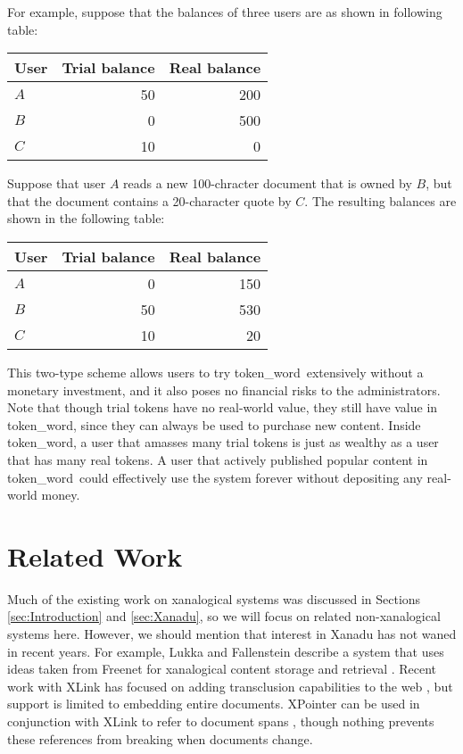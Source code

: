 \documentclass{acm_proc_article-sp}
\newcommand{\tw}{token\_word}
\begin{document}
For example, suppose that the balances of three users are as shown in following table:
\begin{center}
\begin{tabular}{|l||r|r|}
\hline
User&Trial balance &Real balance\\
\hline
$A$&50 &200\\
\hline
$B$&0  &500\\
\hline
$C$&10 &0  \\
\hline
\end{tabular}
\end{center}
Suppose that user $A$ reads a new 100-chracter document that is owned by $B$, but that the document contains a 20-character quote by $C$.
The resulting balances are shown in the following table:
\begin{center}
\begin{tabular}{|l||r|r|}
\hline
User&Trial balance &Real balance\\
\hline
$A$&0 &150\\
\hline
$B$&50  &530\\
\hline
$C$&10 &20  \\
\hline
\end{tabular}
\end{center}


This two-type scheme allows users to try \tw \  extensively without a monetary investment, and it also poses no financial risks to the administrators.
Note that though trial tokens have no real-world value, they still have value in \tw, since they can always be used to purchase new content.
Inside \tw, a user that amasses many trial tokens is just as wealthy as a user that has many real tokens.
A user that actively published popular content in \tw \  could effectively use the system forever without depositing any real-world money.

\section{Related Work}
\label{sec:RelatedWork}

Much of the existing work on xanalogical systems was discussed in Sections \ref{sec:Introduction} and \ref{sec:Xanadu}, so we will focus on related non-xanalogical systems here.
However, we should mention that interest in Xanadu has not waned in recent years.
For example, Lukka and Fallenstein describe a system that uses ideas taken from Freenet for xanalogical content storage and retrieval \cite{FreenetXanadu}.
Recent work with XLink has focused on adding transclusion capabilities to the web \cite{Lowe2001}, but support is limited to embedding entire documents.
XPointer can be used in conjunction with XLink to refer to document spans \cite{Vitali2002}, though nothing prevents these references from breaking when documents change.
\end{document}
